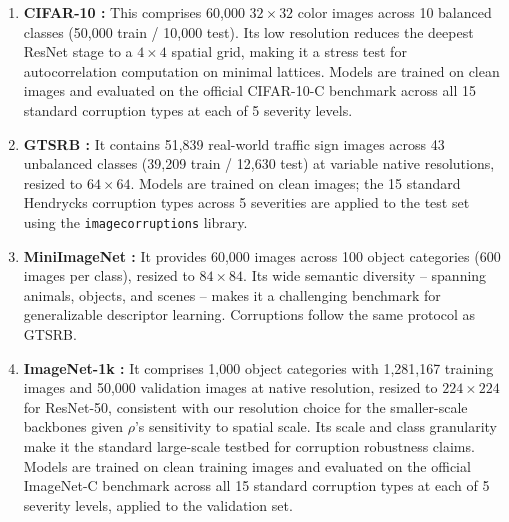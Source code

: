 \documentclass{bmvc2k}
\begin{document}
\begin{enumerate}
    \item \textbf{CIFAR-10 \cite{krizhevsky2009learning}:} This comprises 60,000 $32 \times 32$ color images across 10 balanced classes (50,000 train / 10,000 test). Its low resolution reduces the deepest ResNet stage to a $4 \times 4$ spatial grid, making it a stress test for autocorrelation computation on minimal lattices. Models are trained on clean images and evaluated on the official CIFAR-10-C benchmark \cite{hendrycks2019benchmarkingneuralnetworkrobustness} across all 15 standard corruption types at each of 5 severity levels.
    \item \textbf{GTSRB \cite{stallkamp2012man}:} It contains 51,839 real-world traffic sign images across 43 unbalanced classes (39,209 train / 12,630 test) at variable native resolutions, resized to $64 \times 64$. Models are trained on clean images; the 15 standard Hendrycks corruption types across 5 severities are applied to the test set using the \texttt{imagecorruptions} library.
    \item \textbf{MiniImageNet \cite{vinyals2016matching}:} It provides 60,000 images across 100 object categories (600 images per class), resized to $84 \times 84$. Its wide semantic diversity -- spanning animals, objects, and scenes -- makes it a challenging benchmark for generalizable descriptor learning. Corruptions follow the same protocol as GTSRB.
    \item \textbf{ImageNet-1k \cite{russakovsky2015imagenetlargescalevisual}:} It comprises 1,000 object categories with 1,281,167 training images and 50,000 validation images at native resolution, resized to $224 \times 224$ for ResNet-50, consistent with our resolution choice for the smaller-scale backbones given $\rho$'s sensitivity to spatial scale. Its scale and class granularity make it the standard large-scale testbed for corruption robustness claims. Models are trained on clean training images and evaluated on the official ImageNet-C benchmark \cite{hendrycks2019benchmarkingneuralnetworkrobustness} across all 15 standard corruption types at each of 5 severity levels, applied to the validation set.
\end{enumerate}
\end{document}
